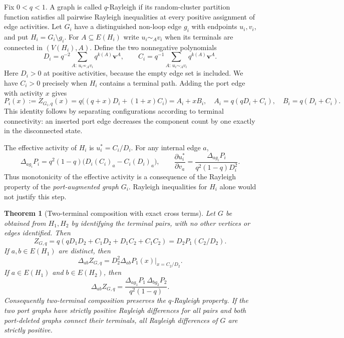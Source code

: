 \documentclass[11pt,a4paper]{article}
\newtheorem{theorem}{Theorem}[section]
\theoremstyle{definition}
\theoremstyle{remark}\newtheorem{remark}[theorem]{Remark}
\begin{document}
Fix $0<q<1$. A graph is called $q$-Rayleigh if its random-cluster
partition function satisfies all pairwise Rayleigh inequalities at
every positive assignment of edge activities.
Let $G_i$ have a distinguished non-loop edge $g_i$ with endpoints
$u_i,v_i$, and put $H_i=G_i\setminus g_i$.
For $A\subseteq E(H_i)$ write $u_i\sim_Av_i$ when its terminals are
connected in $(V(H_i),A)$. Define the two nonnegative polynomials
\[
 D_i=q^{-2}\sum_{A:\,u_i\not\sim_Av_i}q^{k(A)}\boldsymbol v^A,
 \qquad
 C_i=q^{-1}\sum_{A:\,u_i\sim_Av_i}q^{k(A)}\boldsymbol v^A.
\]
Here $D_i>0$ at positive activities, because the empty edge set is
included. We have $C_i>0$ precisely when $H_i$ contains a terminal
path. Adding the port edge with activity $x$ gives
\begin{equation}\label{comp:port}
 P_i(x):=Z_{G_i,q}(x)
 =q\bigl((q+x)D_i+(1+x)C_i\bigr)
 =A_i+xB_i,
 \quad
 A_i=q(qD_i+C_i),\quad B_i=q(D_i+C_i).
\end{equation}
This identity follows by separating configurations according to terminal
connectivity: an inserted port edge decreases the component count by
one exactly in the disconnected state.

The effective activity of $H_i$ is $u_i^*=C_i/D_i$. For any internal
edge $a$,
\begin{equation}\label{comp:response}
 \Delta_{ag_i}P_i
 =q^2(1-q)\bigl(D_i(C_i)_a-C_i(D_i)_a\bigr),
 \qquad
 \frac{\partial u_i^*}{\partial v_a}
 =\frac{\Delta_{ag_i}P_i}{q^2(1-q)D_i^2}.
\end{equation}
Thus monotonicity of the effective activity is a consequence of the
Rayleigh property of the \emph{port-augmented graph} $G_i$.
Rayleigh inequalities for $H_i$ alone would not justify this step.

\begin{theorem}[Two-terminal composition with exact cross terms]
\label{thm:two-terminal-composition}
Let $G$ be obtained from $H_1,H_2$ by identifying the terminal pairs,
with no other vertices or edges identified. Then
\begin{equation}\label{comp:partition}
 Z_{G,q}
 =q(qD_1D_2+C_1D_2+D_1C_2+C_1C_2)
 =D_2P_1(C_2/D_2).
\end{equation}
If $a,b\in E(H_1)$ are distinct, then
\begin{equation}\label{comp:same}
 \Delta_{ab}Z_{G,q}
 =D_2^2\left.\Delta_{ab}P_1(x)\right|_{x=C_2/D_2}.
\end{equation}
If $a\in E(H_1)$ and $b\in E(H_2)$, then
\begin{equation}\label{comp:cross}
 \boxed{\displaystyle
 \Delta_{ab}Z_{G,q}
 =\frac{\Delta_{ag_1}P_1\,\Delta_{bg_2}P_2}
 {q^2(1-q)}.}
\end{equation}
Consequently two-terminal composition preserves the $q$-Rayleigh property.
If the two port graphs have strictly positive Rayleigh differences for
all pairs and both port-deleted graphs connect their terminals, all
Rayleigh differences of $G$ are strictly positive.
\end{theorem}
\end{document}
